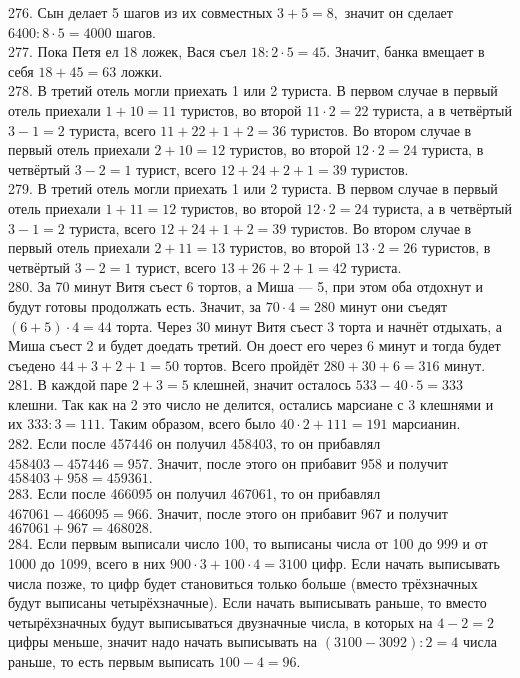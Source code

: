276. Сын делает 5 шагов из их совместных $3+5=8,$ значит он сделает $6400:8\cdot5=4000$ шагов.\\
277. Пока Петя ел 18 ложек, Вася съел $18:2\cdot5=45.$ Значит, банка вмещает в себя $18+45=63$ ложки.\\
278. В третий отель могли приехать 1 или 2 туриста. В первом случае в первый отель приехали $1+10=11$ туристов, во второй $11\cdot2=22$ туриста, а в четвёртый $3-1=2$ туриста, всего $11+22+1+2=36$ туристов. Во втором случае в первый отель приехали $2+10=12$ туристов, во второй $12\cdot2=24$ туриста, в четвёртый $3-2=1$ турист, всего $12+24+2+1=39$ туристов.\\
279. В третий отель могли приехать 1 или 2 туриста. В первом случае в первый отель приехали $1+11=12$ туристов, во второй $12\cdot2=24$ туриста, а в четвёртый $3-1=2$ туриста, всего $12+24+1+2=39$ туристов. Во втором случае в первый отель приехали $2+11=13$ туристов, во второй $13\cdot2=26$ туристов, в четвёртый $3-2=1$ турист, всего $13+26+2+1=42$ туриста.\\
280. За 70 минут Витя съест 6 тортов, а Миша --- 5, при этом оба отдохнут и будут готовы продолжать есть. Значит, за $70\cdot4=280$ минут они съедят $(6+5)\cdot4=44$ торта. Через 30 минут Витя съест 3 торта и начнёт отдыхать, а Миша съест 2 и будет доедать третий. Он доест его через 6 минут и тогда будет съедено $44+3+2+1=50$ тортов. Всего пройдёт $280+30+6=316$ минут.\\
281. В каждой паре $2+3=5$ клешней, значит осталось $533-40\cdot5=333$ клешни. Так как на 2 это число не делится, остались марсиане с 3 клешнями и их $333:3=111.$ Таким образом, всего было $40\cdot2+111=191$ марсианин.\\
282. Если после 457446 он получил 458403, то он прибавлял $458403-457446=957.$ Значит, после этого он прибавит 958 и получит $458403+958=459361.$\\
283. Если после 466095 он получил 467061, то он прибавлял $467061-466095=966.$ Значит, после этого он прибавит 967 и получит $467061+967=468028.$\\
284. Если первым выписали число 100, то выписаны числа от 100 до 999 и от 1000 до 1099, всего в них $900\cdot3+100\cdot4=3100$ цифр. Если начать выписывать числа позже, то цифр будет становиться только больше (вместо трёхзначных будут выписаны четырёхзначные). Если начать выписывать раньше, то вместо четырёхзначных будут выписываться двузначные числа, в которых на $4-2=2$ цифры меньше, значит надо начать выписывать на $(3100-3092):2=4$ числа раньше, то есть первым выписать $100-4=96.$\\
